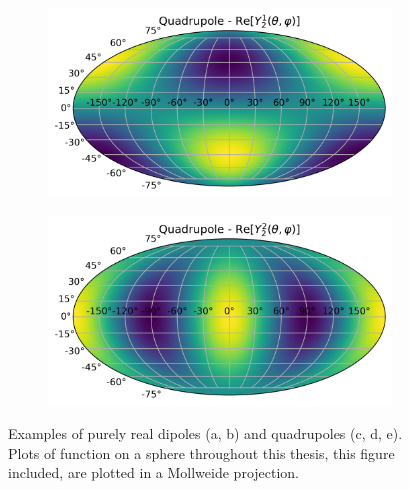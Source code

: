 \documentclass[a4paper,12pt]{report}
\begin{document}
\begin{figure}[t]
\begin{subfigure}[b]{0.3\textwidth}
    \caption{}
    \label{subfig: quadrupole example 02}
  \end{subfigure}
  \begin{subfigure}[b]{0.3\textwidth}
    \includegraphics[width=\textwidth]{Sph Harm Examples/Quadrupole Y12 Re.png}
    \caption{}
    \label{subfig: quadrupole example 12}
  \end{subfigure}
  \begin{subfigure}[b]{0.3\textwidth}
    \includegraphics[width=\textwidth]{Sph Harm Examples/Quadrupole Y22 Re.png}
    \caption{}
    \label{subfig: quadrupole example 22}
  \end{subfigure}
  \caption{Examples of purely real dipoles (a, b) and quadrupoles (c, d, e). Plots of function on a sphere throughout this thesis, this figure included, are plotted in a Mollweide projection.}
  \label{fig: Sph Harm Examples}
\end{figure}
\end{document}
